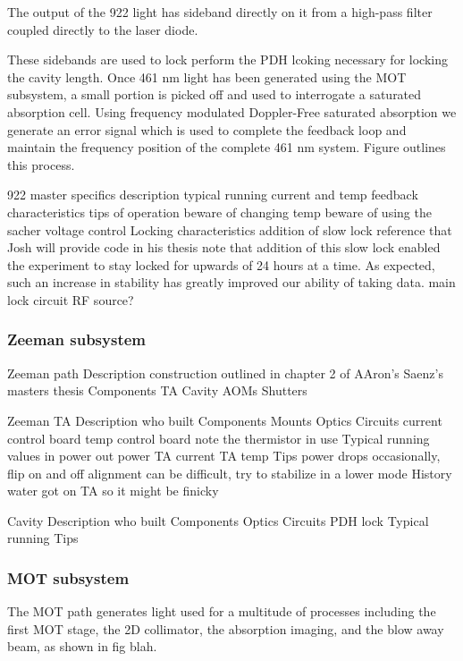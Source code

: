 The output of the 922 light has sideband directly on it from a high-pass filter coupled directly to the laser diode.

These sidebands are used to lock perform the PDH lcoking necessary for locking the cavity length. Once 461 nm light has been generated using the MOT subsystem, a small portion is picked off and used to interrogate a saturated absorption cell. Using frequency modulated Doppler-Free saturated absorption we generate an error signal which is used to complete the feedback loop and maintain the frequency position of the complete 461 nm system.
Figure outlines this process.





922 master specifics
	description
	typical running current and temp
	feedback characteristics
	tips of operation
		beware of changing temp
		beware of using the sacher voltage control
	Locking characteristics
		addition of slow lock
			reference that Josh will provide code in his thesis
			note that addition of this slow lock enabled the experiment to stay locked for upwards of 24 hours at a time. As expected, such an increase in stability has greatly improved our ability of taking data.
		main lock circuit
		RF source?
		
\subsubsection{Zeeman subsystem}

Zeeman path
	Description
		construction outlined in chapter 2 of AAron's Saenz's masters thesis
	Components
		TA
		Cavity
		AOMs
		Shutters
	
	Zeeman TA
		Description
			who built
		Components
			Mounts
			Optics
			Circuits
				current control board
				temp control board
					note the thermistor in use
		Typical running values
			in power
			out power
			TA current
			TA temp
		Tips
			power drops occasionally, flip on and off
			alignment can be difficult, try to stabilize in a lower mode
		History
			water got on TA so it might be finicky
		
	Cavity
		Description
			who built
		Components
			Optics
			Circuits
				PDH lock
		Typical running
		Tips

\subsubsection{MOT subsystem}

The MOT path generates light used for a multitude of processes including the first MOT stage, the 2D collimator, the absorption imaging, and the blow away beam, as shown in fig blah. 

